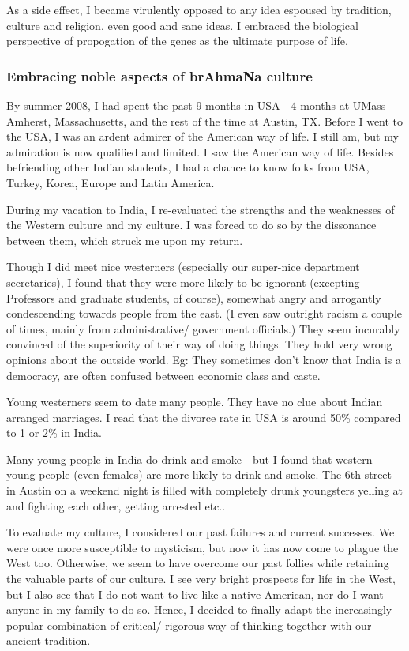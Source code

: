 \documentclass[oneside, article]{memoir}
\begin{document}
As a side effect, I became virulently opposed to any idea espoused by tradition, culture and religion, even good and sane ideas. I embraced the biological perspective of propogation of the genes as the ultimate purpose of life.

\subsubsection{Embracing noble aspects of brAhmaNa culture}
By summer 2008, I had spent the past 9 months in USA - 4 months at UMass Amherst, Massachusetts, and the rest of the time at Austin, TX. Before I went to the USA, I was an ardent admirer of the American way of life. I still am, but my admiration is now qualified and limited. I saw the American way of life. Besides befriending other Indian students, I had a chance to know folks from USA, Turkey, Korea, Europe and Latin America.

During my vacation to India, I re-evaluated the strengths and the weaknesses of the Western culture and my culture. I was forced to do so by the dissonance between them, which struck me upon my return.

Though I did meet nice westerners (especially our super-nice department secretaries), I found that they were more likely to be ignorant (excepting Professors and graduate students, of course), somewhat angry and arrogantly condescending towards people from the east. (I even saw outright racism a couple of times, mainly from administrative/ government officials.) They seem incurably convinced of the superiority of their way of doing things. They hold very wrong opinions about the outside world. Eg: They sometimes don't know that India is a democracy, are often confused between economic class and caste.

Young westerners seem to date many people. They have no clue about Indian arranged marriages. I read that the divorce rate in USA is around 50\% compared to 1 or 2\% in India.

Many young people in India do drink and smoke - but I found that western young people (even females) are more likely to drink and smoke. The 6th street in Austin on a weekend night is filled with completely drunk youngsters yelling at and fighting each other, getting arrested etc..

To evaluate my culture, I considered our past failures and current successes. We were once more susceptible to mysticism, but now it has now come to plague the West too. Otherwise, we seem to have overcome our past follies while retaining the valuable parts of our culture. I see very bright prospects for life in the West, but I also see that I do not want to live like a native American, nor do I want anyone in my family to do so. Hence, I decided to finally adapt the increasingly popular combination of critical/ rigorous way of thinking together with our ancient tradition.
\end{document}
